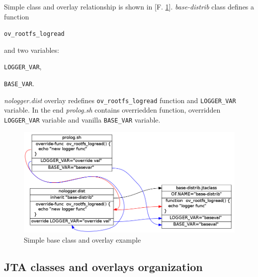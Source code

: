 Simple class and overlay relationship is shown in [F. \ref{fig:base_ov_example}].
\textit{base-distrib} class defines a function
\begin{description}
\item \texttt{ov\_rootfs\_logread}
\end{description}

and two variables:
\begin{description}
\item \texttt{LOGGER\_VAR},
\item \texttt{BASE\_VAR}.
\end{description}

\textit{nologger.dist} overlay redefines \texttt{ov\_rootfs\_logread} function and \texttt{LOGGER\_VAR} variable. In the end \textit{prolog.sh} contains overriedden function, overridden \texttt{LOGGER\_VAR} variable and vanilla \texttt{BASE\_VAR} variable.


\begin{figure}[H]
  \includegraphics*[width=16cm]{overlays_example.png}
  \caption{Simple base class and overlay example}
  \label{fig:base_ov_example}
\end{figure}


\subsection{JTA classes and overlays organization}
\label{sec:jta_class_ov}

